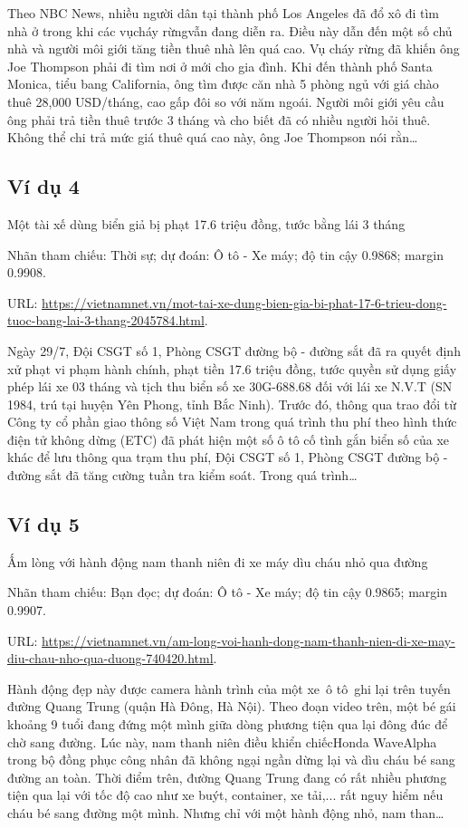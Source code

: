Theo NBC News, nhiều người dân tại thành phố Los Angeles đã đổ xô đi tìm nhà ở trong khi các vụcháy rừngvẫn đang diễn ra. Điều này dẫn đến một số chủ nhà và người môi giới tăng tiền thuê nhà lên quá cao. Vụ cháy rừng đã khiến ông Joe Thompson phải đi tìm nơi ở mới cho gia đình. Khi đến thành phố Santa Monica, tiểu bang California, ông tìm được căn nhà 5 phòng ngủ với giá chào thuê 28,000 USD/tháng, cao gấp đôi so với năm ngoái. Người môi giới yêu cầu ông phải trả tiền thuê trước 3 tháng và cho biết đã có nhiều người hỏi thuê. Không thể chi trả mức giá thuê quá cao này, ông Joe Thompson nói rằn\ldots

\subsection{Ví dụ 4}
Một tài xế dùng biển giả bị phạt 17.6 triệu đồng, tước bằng lái 3 tháng

\noindent Nhãn tham chiếu: Thời sự; dự đoán: Ô tô - Xe máy; độ tin cậy 0.9868; margin 0.9908.

\noindent URL: \url{https://vietnamnet.vn/mot-tai-xe-dung-bien-gia-bi-phat-17-6-trieu-dong-tuoc-bang-lai-3-thang-2045784.html}.

Ngày 29/7, Đội CSGT số 1, Phòng CSGT đường bộ - đường sắt đã ra quyết định xử phạt vi phạm hành chính, phạt tiền 17.6 triệu đồng, tước quyền sử dụng giấy phép lái xe 03 tháng và tịch thu biển số xe 30G-688.68 đối với lái xe N.V.T (SN 1984, trú tại huyện Yên Phong, tỉnh Bắc Ninh). Trước đó, thông qua trao đổi từ Công ty cổ phần giao thông số Việt Nam trong quá trình thu phí theo hình thức điện tử không dừng (ETC) đã phát hiện một số ô tô cố tình gắn biển số của xe khác để lưu thông qua trạm thu phí, Đội CSGT số 1, Phòng CSGT đường bộ - đường sắt đã tăng cường tuần tra kiểm soát. Trong quá trình\ldots

\subsection{Ví dụ 5}
Ấm lòng với hành động nam thanh niên đi xe máy dìu cháu nhỏ qua đường

\noindent Nhãn tham chiếu: Bạn đọc; dự đoán: Ô tô - Xe máy; độ tin cậy 0.9865; margin 0.9907.

\noindent URL: \url{https://vietnamnet.vn/am-long-voi-hanh-dong-nam-thanh-nien-di-xe-may-diu-chau-nho-qua-duong-740420.html}.

Hành động đẹp này được camera hành trình của một xe ô tô ghi lại trên tuyến đường Quang Trung (quận Hà Đông, Hà Nội). Theo đoạn video trên, một bé gái khoảng 9 tuổi đang đứng một mình giữa dòng phương tiện qua lại đông đúc để chờ sang đường. Lúc này, nam thanh niên điều khiển chiếcHonda WaveAlpha trong bộ đồng phục công nhân đã không ngại ngần dừng lại và dìu cháu bé sang đường an toàn. Thời điểm trên, đường Quang Trung đang có rất nhiều phương tiện qua lại với tốc độ cao như xe buýt, container, xe tải,... rất nguy hiểm nếu cháu bé sang đường một mình. Nhưng chỉ với một hành động nhỏ, nam than\ldots

